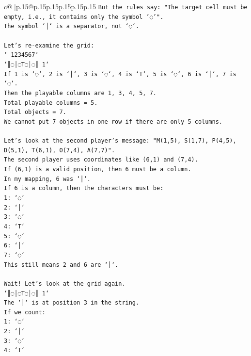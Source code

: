 \documentclass{article}
\begin{document}
{\begin{supertabular}{c@{$\;$}|p{.15\linewidth}@{}p{.15\linewidth}p{.15\linewidth}p{.15\linewidth}p{.15\linewidth}p{.15\linewidth}}
{{{\texttt{But the rules say: "The target cell must be empty, i.e., it contains only the symbol '◌'".} \\
\texttt{The symbol `│` is a separator, not `◌`.} \\
\\ 
\texttt{Let's re{-}examine the grid:} \\
\texttt{` 1234567`} \\
\texttt{`║◌│◌T◌│◌║ 1`} \\
\texttt{If 1 is `◌`, 2 is `│`, 3 is `◌`, 4 is `T`, 5 is `◌`, 6 is `│`, 7 is `◌`.} \\
\texttt{Then the playable columns are 1, 3, 4, 5, 7.} \\
\texttt{Total playable columns = 5.} \\
\texttt{Total objects = 7.} \\
\texttt{We cannot put 7 objects in one row if there are only 5 columns.} \\
\\ 
\texttt{Let's look at the second player's message: "M(1,5), S(1,7), P(4,5), D(5,1), T(6,1), O(7,4), A(7,7)".} \\
\texttt{The second player uses coordinates like (6,1) and (7,4).} \\
\texttt{If (6,1) is a valid position, then 6 must be a column.} \\
\texttt{In my mapping, 6 was `│`.} \\
\texttt{If 6 is a column, then the characters must be:} \\
\texttt{1: `◌`} \\
\texttt{2: `│`} \\
\texttt{3: `◌`} \\
\texttt{4: `T`} \\
\texttt{5: `◌`} \\
\texttt{6: `│`} \\
\texttt{7: `◌`} \\
\texttt{This still means 2 and 6 are `│`.} \\
\\ 
\texttt{Wait! Let's look at the grid again.} \\
\texttt{`║◌│◌T◌│◌║ 1`} \\
\texttt{The `│` is at position 3 in the string.} \\
\texttt{If we count:} \\
\texttt{1: `◌`} \\
\texttt{2: `│`} \\
\texttt{3: `◌`} \\
\texttt{4: `T`} \\
}}}
\end{supertabular}}
\end{document}
